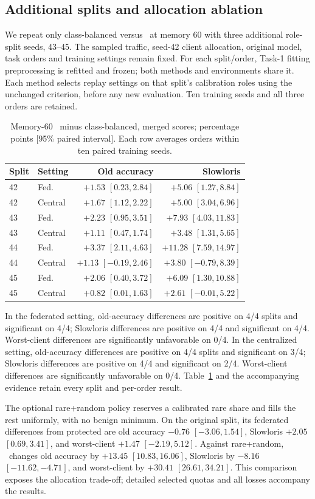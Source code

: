 \subsection{Additional splits and allocation ablation}
We repeat only class-balanced versus \BR\ at memory 60 with three additional role-split seeds, 43--45. The sampled traffic, seed-42 client allocation, original model, task orders and training settings remain fixed. For each split/order, Task-1 fitting preprocessing is refitted and frozen; both methods and environments share it. Each method selects replay settings on that split's calibration roles using the unchanged criterion, before any new evaluation. Ten training seeds and all three orders are retained.

\begin{table}[t]
\centering
\caption{Memory-60 \BR\ minus class-balanced, merged scores; percentage points [95\% paired interval]. Each row averages orders within ten paired training seeds.}
\label{tab:splits}
\footnotesize
\setlength{\tabcolsep}{3pt}
\begin{tabular}{llrr}
\toprule
Split & Setting & Old accuracy & Slowloris\\
\midrule
42 & Fed. & $+1.53$ $[0.23,2.84]$ & $+5.06$ $[1.27,8.84]$\\
42 & Central & $+1.67$ $[1.12,2.22]$ & $+5.00$ $[3.04,6.96]$\\
43 & Fed. & $+2.23$ $[0.95,3.51]$ & $+7.93$ $[4.03,11.83]$\\
43 & Central & $+1.11$ $[0.47,1.74]$ & $+3.48$ $[1.31,5.65]$\\
44 & Fed. & $+3.37$ $[2.11,4.63]$ & $+11.28$ $[7.59,14.97]$\\
44 & Central & $+1.13$ $[-0.19,2.46]$ & $+3.80$ $[-0.79,8.39]$\\
45 & Fed. & $+2.06$ $[0.40,3.72]$ & $+6.09$ $[1.30,10.88]$\\
45 & Central & $+0.82$ $[0.01,1.63]$ & $+2.61$ $[-0.01,5.22]$\\
\bottomrule
\end{tabular}
\end{table}
In the federated setting, old-accuracy differences are positive on 4/4 splits and significant on 4/4; Slowloris differences are positive on 4/4 and significant on 4/4. Worst-client differences are significantly unfavorable on 0/4. In the centralized setting, old-accuracy differences are positive on 4/4 splits and significant on 3/4; Slowloris differences are positive on 4/4 and significant on 2/4. Worst-client differences are significantly unfavorable on 0/4. Table~\ref{tab:splits} and the accompanying evidence retain every split and per-order result.

The optional rare+random policy reserves a calibrated rare share and fills the rest uniformly, with no benign minimum. On the original split, its federated differences from protected are old accuracy $-0.76$ $[-3.06,1.54]$, Slowloris $+2.05$ $[0.69,3.41]$, and worst-client $+1.47$ $[-2.19,5.12]$. Against rare+random, \BR\ changes old accuracy by $+13.45$ $[10.83,16.06]$, Slowloris by $-8.16$ $[-11.62,-4.71]$, and worst-client by $+30.41$ $[26.61,34.21]$. This comparison exposes the allocation trade-off; detailed selected quotas and all losses accompany the results.

